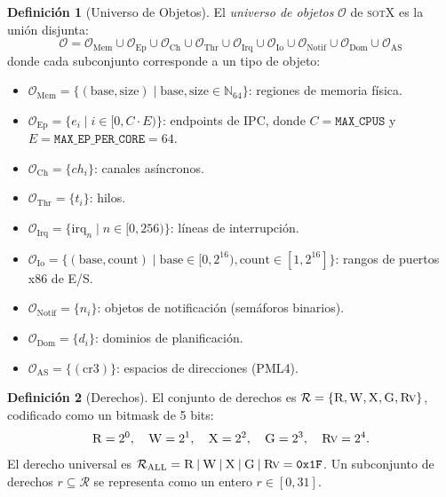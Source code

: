 \documentclass[11pt,twoside,openright]{book}
\theoremstyle{definition}
\newtheorem{definition}{Definición}[chapter]
\theoremstyle{plain}
\theoremstyle{remark}
\newcommand{\sotos}{\textsc{sotX}}
\newcommand{\rights}{\mathcal{R}}
\newcommand{\rightsall}{\rights_{\mathrm{ALL}}}
\newcommand{\bitor}{\mathbin{|}}
\begin{document}
\begin{definition}[Universo de Objetos]
\label{def:object-universe}
El \emph{universo de objetos} $\mathcal{O}$ de \sotos{} es la unión disjunta:
\[
    \mathcal{O} = \mathcal{O}_{\text{Mem}} \cup \mathcal{O}_{\text{Ep}} \cup
    \mathcal{O}_{\text{Ch}} \cup \mathcal{O}_{\text{Thr}} \cup
    \mathcal{O}_{\text{Irq}} \cup \mathcal{O}_{\text{Io}} \cup
    \mathcal{O}_{\text{Notif}} \cup \mathcal{O}_{\text{Dom}} \cup
    \mathcal{O}_{\text{AS}}
\]
donde cada subconjunto corresponde a un tipo de objeto:
\begin{itemize}
    \item $\mathcal{O}_{\text{Mem}} = \{(\text{base}, \text{size}) \mid \text{base}, \text{size} \in \mathbb{N}_{64}\}$:
          regiones de memoria física.
    \item $\mathcal{O}_{\text{Ep}} = \{e_i \mid i \in [0, C \cdot E)\}$: endpoints de IPC,
          donde $C = \texttt{MAX\_CPUS}$ y $E = \texttt{MAX\_EP\_PER\_CORE} = 64$.
    \item $\mathcal{O}_{\text{Ch}} = \{ch_i\}$: canales asíncronos.
    \item $\mathcal{O}_{\text{Thr}} = \{t_i\}$: hilos.
    \item $\mathcal{O}_{\text{Irq}} = \{\text{irq}_n \mid n \in [0, 256)\}$: líneas de interrupción.
    \item $\mathcal{O}_{\text{Io}} = \{(\text{base}, \text{count}) \mid \text{base} \in [0, 2^{16}), \text{count} \in [1, 2^{16}]\}$:
          rangos de puertos x86 de E/S.
    \item $\mathcal{O}_{\text{Notif}} = \{n_i\}$: objetos de notificación (semáforos binarios).
    \item $\mathcal{O}_{\text{Dom}} = \{d_i\}$: dominios de planificación.
    \item $\mathcal{O}_{\text{AS}} = \{(\text{cr3})\}$: espacios de direcciones (PML4).
\end{itemize}
\end{definition}

\begin{definition}[Derechos]
\label{def:rights}
El conjunto de derechos es $\rights = \{\textsc{R}, \textsc{W}, \textsc{X}, \textsc{G}, \textsc{Rv}\}$,
codificado como un bitmask de 5 bits:
\[
    \textsc{R} = 2^0, \quad
    \textsc{W} = 2^1, \quad
    \textsc{X} = 2^2, \quad
    \textsc{G} = 2^3, \quad
    \textsc{Rv} = 2^4.
\]
El derecho universal es $\rightsall = \textsc{R} \bitor \textsc{W} \bitor \textsc{X} \bitor \textsc{G} \bitor \textsc{Rv} = \texttt{0x1F}$.
Un subconjunto de derechos $r \subseteq \rights$ se representa como un entero $r \in [0, 31]$.
\end{definition}
\end{document}
